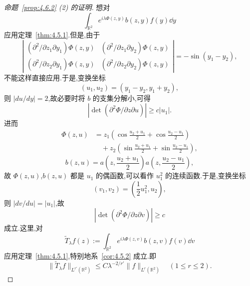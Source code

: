 \begin{proof}[命题~\ref{prop:4.6.2} (2) 的证明]
想对
\begin{equation*}
\int_{\mathbb{R}^{2}}e^{i\lambda\Phi(z, y)}b(z, y)f(y)\dd y
\end{equation*}
应用定理~\ref{thm:4.5.1}.但是,由于
\begin{equation*}
\left|\begin{array}{cc}
(\partial^{2}/\partial z_{1}\partial y_{1})\Phi(z, y) & (\partial^{2}/\partial z_{1}\partial y_{2})\Phi(z, y) \\
(\partial^{2}/\partial z_{2}\partial y_{1})\Phi(z, y) & (\partial^{2}/\partial z_{2}\partial y_{2})\Phi(z, y)
\end{array}\right| = -\sin(y_{1} - y_{2}),
\end{equation*}
不能这样直接应用.于是,变换坐标
\begin{equation*}
(u_{1}, u_{2}) = (y_{1} - y_{2}, y_{1} + y_{2}),
\end{equation*}
则 $|du/dy| = 2$,故必要时将 $b$ 的支集分解小,可得
\begin{equation*}
|\det(\partial^{2}\Phi/\partial z\partial u)| \geq c|u_{1}|.
\end{equation*}
进而
\begin{equation}
\begin{aligned}
\Phi(z, u) & = z_{1}\left(\cos\frac{u_{2} + u_{1}}{2} + \cos\frac{u_{2} - u_{1}}{2}\right) \\
& \quad + z_{2}\left(\sin\frac{u_{2} + u_{1}}{2} + \sin\frac{u_{2} - u_{1}}{2}\right),
\end{aligned}
\end{equation}
\begin{equation*}
b(z, u) = a\left(z, \frac{u_{2} + u_{1}}{2}\right)a\left(z, \frac{u_{2} - u_{1}}{2}\right),
\end{equation*}
故 $\Phi(z, u)$,$b(z, u)$ 都是 $u_{1}$ 的偶函数,可以看作 $u_{1}^{2}$ 的连续函数.于是,变换坐标
\begin{equation*}
(v_{1}, v_{2}) = \left(\frac{1}{2}u_{1}^{2}, u_{2}\right),
\end{equation*}
则 $|dv/du| = |u_{1}|$,故
\begin{equation*}
|\det(\partial^{2}\Phi/\partial z\partial v)| \geq c
\end{equation*}
成立.这里,对
\begin{equation*}
\tilde{T}_{\lambda}f(z) := \int_{\mathbb{R}^{2}}e^{i\lambda\Phi(z, v)}b(z, v)f(v)\dd v
\end{equation*}
应用定理~\ref{thm:4.5.1},特别地系~\ref{cor:4.5.2} 成立.即
\begin{equation}
\|\tilde{T}_{\lambda}f\|_{L^{r'}(\mathbb{R}^{2})} \leq C\lambda^{-2/r'}\|f\|_{L^{r}(\mathbb{R}^{2})} \quad (1 \leq r \leq 2).\tag{4.6.15}
\label{eq:4.6.15}\end{equation}


\end{proof}
